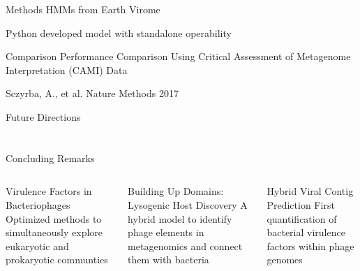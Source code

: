 \documentclass[11pt, xcolor=table]{beamer}
\begin{document}
  \begin{frame}{Methods}
  HMMs from Earth Virome
  
  Python developed model with standalone operability
  
  \end{frame}
  \begin{frame}{Comparison}
  Performance Comparison Using Critical Assessment of Metagenome Interpretation (CAMI) Data
  
  
  
  \tiny{Sczyrba, A., et al. Nature Methods 2017}
	\end{frame}
	
	\begin{frame}{Future Directions}

	\end{frame}
\section{}
	
	\begin{frame}{Concluding Remarks}
	\begin{columns}
	\begin{block}{Virulence Factors in Bacteriophages}
	Optimized methods to simultaneously explore eukaryotic and prokaryotic communties
	\end{block}
	\begin{block}{Building Up Domains: Lysogenic Host Discovery}
	A hybrid model to identify phage elements in metagenomics and connect them with bacteria
	\end{block}
	\begin{block}{Hybrid Viral Contig Prediction}
	First quantification of bacterial virulence factors within phage genomes
	\end{block}
	
	\end{columns}
	
	\end{frame}
	
	
\end{document}
